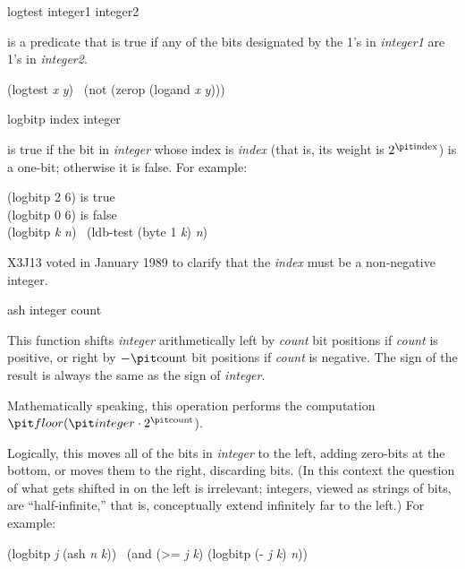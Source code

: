\begin{defun}[Function]
logtest integer1 integer2

 is a predicate that is true if any of
the bits designated by the 1's in {\it integer1} are 1's in {\it integer2}.
\begin{lisp}
(logtest {\it x} {\it y}) \EQ\ (not (zerop (logand {\it x} {\it y})))
\end{lisp}
\end{defun}

\begin{defun}[Function]
logbitp index integer

 is true if the bit in {\it integer} whose index
is {\it index} (that is, its weight is $2^{\hbox{\scriptsize\it index}}$) is a one-bit;
otherwise it is false.
For example:
\begin{lisp}
(logbitp 2 6) {\rm is true} \\
(logbitp 0 6) {\rm is false} \\
(logbitp {\it k} {\it n}) \EQ\ (ldb-test (byte 1 {\it k}) {\it n})
\end{lisp}
\begin{new}
X3J13 voted in January 1989
to clarify that the {\it index} must be a non-negative integer.
\end{new}
\end{defun}

\begin{defun}[Function]
ash integer count

This function shifts {\it integer} arithmetically left by {\it count} bit
positions if {\it count} is positive,
or right by $-\hbox{\it count}$ bit positions if {\it count} is negative.
The sign of the result is always the same as the sign of {\it integer}.

Mathematically speaking, this operation performs the computation
${\it floor}({\it integer}\cdot2^{\hbox{\scriptsize\it count}}$).

Logically, this moves all of the bits in {\it integer} to the left,
adding zero-bits at the bottom, or moves them to the right,
discarding bits.  (In this context the question of what gets shifted
in on the left is irrelevant; integers, viewed as strings of bits,
are ``half-infinite,'' that is, conceptually extend infinitely far to the left.)
For example:
\begin{lisp}
(logbitp {\it j} (ash {\it n} {\it k})) \EQ\ (and (>= {\it j} {\it k}) (logbitp (- {\it j} {\it k}) {\it n}))
\end{lisp}
\end{defun}

